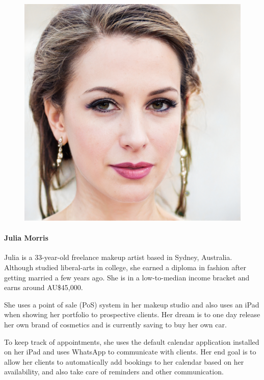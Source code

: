 \documentclass{article}
\begin{document}
\begin{figure}
	\includegraphics[scale=0.11]{persona-julia.jpg}
\end{figure}

\paragraph{Julia Morris}

Julia is a 33-year-old freelance makeup artist based in Sydney, Australia. Although studied liberal-arts in college, she earned a diploma in fashion after getting married a few years ago. She is in a low-to-median income bracket and earns around AU\$45,000.

She uses a point of sale (PoS) system in her makeup studio and also uses an iPad when showing her portfolio to prospective clients. Her dream is to one day release her own brand of cosmetics and is currently saving to buy her own car.

To keep track of appointments, she uses the default calendar application installed on her iPad and uses WhatsApp to communicate with clients. Her end goal is to allow her clients to automatically add bookings to her calendar based on her availability, and also take care of reminders and other communication.
\end{document}
